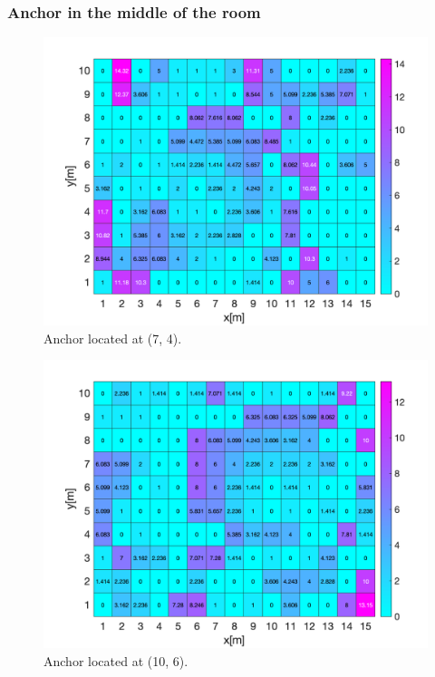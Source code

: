 \subsubsection*{Anchor in the middle of the room}

\begin{figure}[H]
\centering
\includegraphics[width=.9\linewidth]{Images/Anchor_at_(7_4).png}
\caption{Anchor located at (7, 4).}
\end{figure}

\begin{figure}[H]
\centering
\includegraphics[width=.9\linewidth]{Images/Anchor_at_(10_6).png}
\caption{Anchor located at (10, 6).}
\end{figure}


